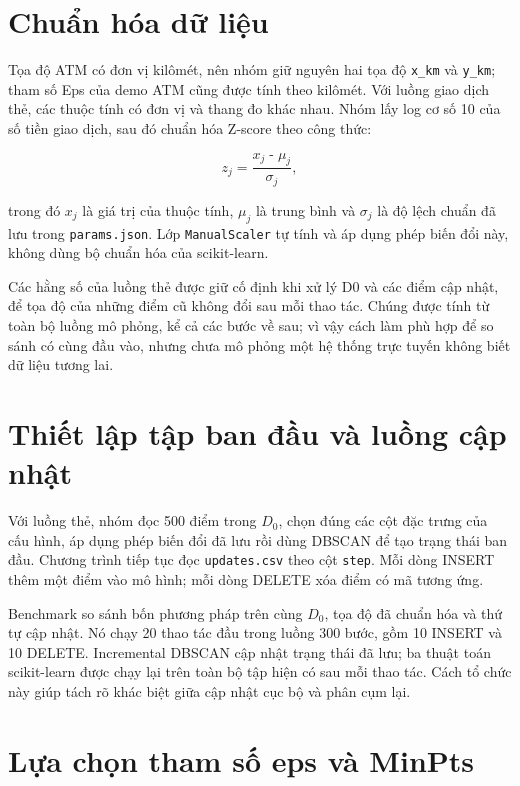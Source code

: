\section{Chuẩn hóa dữ liệu}

Tọa độ ATM có đơn vị kilômét, nên nhóm giữ nguyên hai tọa độ \texttt{x\_km} và \texttt{y\_km}; tham số Eps của demo ATM cũng được tính theo kilômét. Với luồng giao dịch thẻ, các thuộc tính có đơn vị và thang đo khác nhau. Nhóm lấy log cơ số 10 của số tiền giao dịch, sau đó chuẩn hóa Z-score theo công thức:

\begin{equation}
    z_j = \frac{x_j \;\text{-}\; \mu_j}{\sigma_j},
\end{equation}

trong đó \(x_j\) là giá trị của thuộc tính, \(\mu_j\) là trung bình và \(\sigma_j\) là độ lệch chuẩn đã lưu trong \texttt{params.json}. Lớp \texttt{ManualScaler} tự tính và áp dụng phép biến đổi này, không dùng bộ chuẩn hóa của scikit-learn.

Các hằng số của luồng thẻ được giữ cố định khi xử lý D0 và các điểm cập nhật, để tọa độ của những điểm cũ không đổi sau mỗi thao tác. Chúng được tính từ toàn bộ luồng mô phỏng, kể cả các bước về sau; vì vậy cách làm phù hợp để so sánh có cùng đầu vào, nhưng chưa mô phỏng một hệ thống trực tuyến không biết dữ liệu tương lai.

\section{Thiết lập tập ban đầu và luồng cập nhật}

Với luồng thẻ, nhóm đọc 500 điểm trong \(D_0\), chọn đúng các cột đặc trưng của cấu hình, áp dụng phép biến đổi đã lưu rồi dùng DBSCAN để tạo trạng thái ban đầu. Chương trình tiếp tục đọc \texttt{updates.csv} theo cột \texttt{step}. Mỗi dòng INSERT thêm một điểm vào mô hình; mỗi dòng DELETE xóa điểm có mã tương ứng.

Benchmark so sánh bốn phương pháp trên cùng \(D_0\), tọa độ đã chuẩn hóa và thứ tự cập nhật. Nó chạy 20 thao tác đầu trong luồng 300 bước, gồm 10 INSERT và 10 DELETE. Incremental DBSCAN cập nhật trạng thái đã lưu; ba thuật toán scikit-learn được chạy lại trên toàn bộ tập hiện có sau mỗi thao tác. Cách tổ chức này giúp tách rõ khác biệt giữa cập nhật cục bộ và phân cụm lại.

\section{Lựa chọn tham số eps và MinPts}

